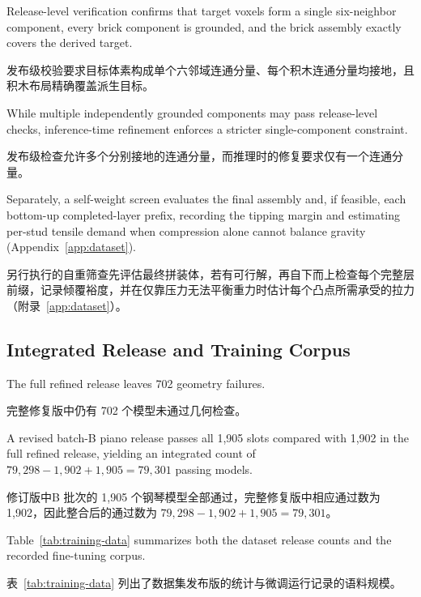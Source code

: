 \documentclass[11pt,letterpaper]{article}
\newcommand{\zh}[1]{{\chinesefont #1}}
\newcommand{\pair}[2]{\par\addvspace{4pt}\noindent
  \begin{minipage}{\linewidth}\raggedright
  #1\par\nobreak\vspace{1pt}
  {\color{translation}\chinesefont\fontsize{10.5}{15.3}\selectfont #2\par}
  \end{minipage}\par}
\begin{document}
\pair{Release-level verification confirms that target voxels form a single six-neighbor component, every brick component is grounded, and the brick assembly exactly covers the derived target.}{发布级校验要求目标体素构成单个六邻域连通分量、每个积木连通分量均接地，且积木布局精确覆盖派生目标。}

\pair{While multiple independently grounded components may pass release-level checks, inference-time refinement enforces a stricter single-component constraint.}{发布级检查允许多个分别接地的连通分量，而推理时的修复要求仅有一个连通分量。}

\pair{Separately, a self-weight screen evaluates the final assembly and, if feasible, each bottom-up completed-layer prefix, recording the tipping margin and estimating per-stud tensile demand when compression alone cannot balance gravity (Appendix~\ref{app:dataset}).}{另行执行的自重筛查先评估最终拼装体，若有可行解，再自下而上检查每个完整层前缀，记录倾覆裕度，并在仅靠压力无法平衡重力时估计每个凸点所需承受的拉力（附录~\ref{app:dataset}）。}

\subsection{Integrated Release and Training Corpus\enspace\zh{整合发布版与训练语料}}

\pair{The full refined release leaves 702 geometry failures.}{完整修复版中仍有 702 个模型未通过几何检查。}

\pair{A revised batch-B piano release passes all 1,905 slots compared with 1,902 in the full refined release, yielding an integrated count of $79{,}298-1{,}902+1{,}905=79{,}301$ passing models.}{修订版中B 批次的 1,905 个钢琴模型全部通过，完整修复版中相应通过数为 1,902，因此整合后的通过数为 $79{,}298-1{,}902+1{,}905=79{,}301$。}

\pair{Table~\ref{tab:training-data} summarizes both the dataset release counts and the recorded fine-tuning corpus.}{表~\ref{tab:training-data} 列出了数据集发布版的统计与微调运行记录的语料规模。}
\end{document}
